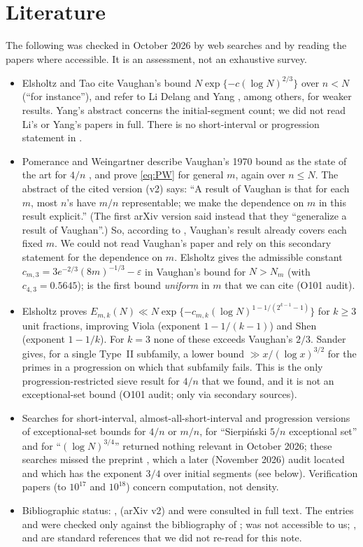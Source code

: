 \documentclass[10pt,reqno]{amsart}
\theoremstyle{definition}
\begin{document}
\section{Literature}\label{sec:literature}
The following was checked in October 2026 by web searches and by
reading the papers where accessible.  It is an assessment, not an
exhaustive survey.
\begin{itemize}
\item Elsholtz and Tao \cite[\S1]{ET} cite Vaughan's bound
$N\exp\{-c(\log N)^{2/3}\}$ over $n<N$ (``for instance''), and refer to
Li Delang \cite{Li} and Yang \cite{Yang}, among others, for weaker
results.  Yang's abstract concerns the initial-segment
count; we did not read Li's or Yang's papers in full.  There is no
short-interval or progression statement in \cite{ET}.
\item Pomerance and Weingartner \cite{PW} describe Vaughan's 1970
bound as the state of the art for $4/n$ \cite[p.~2]{PW}, and prove
\eqref{eq:PW} for general $m$, again over $n\leq N$.  The abstract of the
cited version (v2) says: ``A result of Vaughan is that for each $m$, most
$n$'s have $m/n$ representable; we make the dependence on $m$ in this
result explicit.''  (The first arXiv version said instead that they
``generalize a result of Vaughan''.)  So, according to \cite{PW},
Vaughan's result already covers each fixed $m$.  We could not read
Vaughan's paper and rely on this secondary statement for the dependence
on $m$.  Elsholtz \cite[Rem.~7.3]{Els} gives the admissible constant
$c_{m,3}=3e^{-2/3}(8m)^{-1/3}-\varepsilon$ in Vaughan's bound for $N>N_m$
(with $c_{4,3}=0.5645$); \cite[Thm.~1.3]{PW} is the first bound
\emph{uniform} in $m$ that we can cite (O101 audit).
\item Elsholtz \cite[p.~3210]{Els} proves
$E_{m,k}(N)\ll N\exp\{-c_{m,k}(\log N)^{1-1/(2^{k-1}-1)}\}$ for $k\geq3$
unit fractions, improving Viola \cite{Viola} (exponent $1-1/(k-1)$) and
Shen \cite{Shen} (exponent $1-1/k$).  For $k=3$ none of these exceeds
Vaughan's $2/3$.  Sander \cite{Sander} gives, for a single Type~II
subfamily, a lower bound $\gg x/(\log x)^{3/2}$ for the primes in a
progression on which that subfamily fails.  This is the only
progression-restricted sieve result for $4/n$ that we found, and it is
not an exceptional-set bound (O101 audit; \cite{Viola,Shen,Sander}
only via secondary sources).
\item Searches for short-interval, almost-all-short-interval and
progression versions of exceptional-set bounds for $4/n$ or $m/n$, for
``Sierpi\'nski $5/n$ exceptional set'' and for ``$(\log N)^{3/4}$''
returned nothing relevant in October 2026; these searches missed the
preprint \cite{KRK}, which a later (November 2026) audit located and
which has the exponent $3/4$ over initial segments (see below).
Verification papers (to $10^{17}$ and
$10^{18}$) concern computation, not density.
\item Bibliographic status: \cite{ET}, \cite{PW} (arXiv v2) and
\cite{Shiu} were consulted in full text.  The entries \cite{Li} and \cite{Yang} were checked only
against the bibliography of \cite{ET}; \cite{Vaughan} was not accessible
to us; \cite{MV}, \cite{Davenport} and \cite{BHP} are standard references
that we did not re-read for this note.
\end{itemize}
\end{document}
